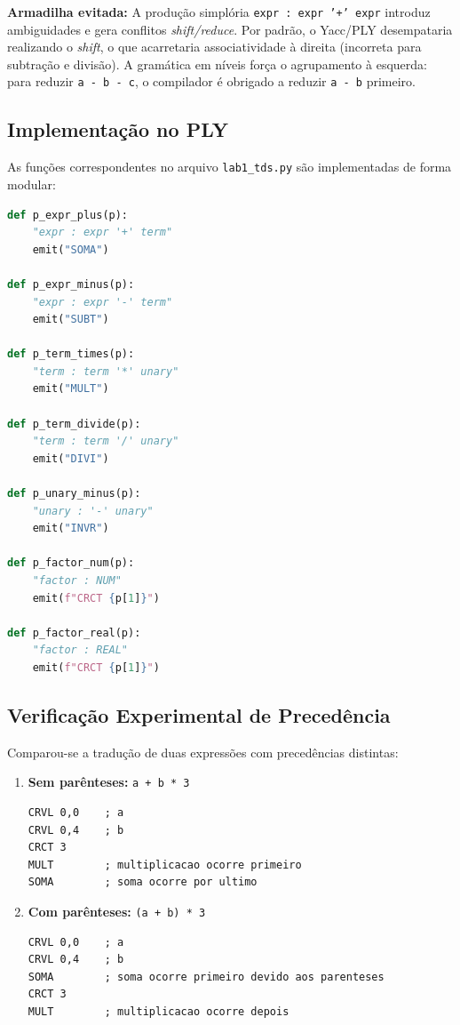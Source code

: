 \documentclass[12pt,a4paper]{article}
\begin{document}
\noindent\textbf{Armadilha evitada:} A produção simplória \texttt{expr : expr '+' expr}
introduz ambiguidades e gera conflitos \textit{shift/reduce}. Por padrão, o Yacc/PLY
desempataria realizando o \textit{shift}, o que acarretaria associatividade à direita
(incorreta para subtração e divisão). A gramática em níveis força o agrupamento à esquerda:
para reduzir \texttt{a - b - c}, o compilador é obrigado a reduzir \texttt{a - b} primeiro.

\subsection{Implementação no PLY}

As funções correspondentes no arquivo \texttt{lab1\_tds.py} são implementadas de
forma modular:

\begin{lstlisting}[language=Python]
def p_expr_plus(p):
    "expr : expr '+' term"
    emit("SOMA")

def p_expr_minus(p):
    "expr : expr '-' term"
    emit("SUBT")

def p_term_times(p):
    "term : term '*' unary"
    emit("MULT")

def p_term_divide(p):
    "term : term '/' unary"
    emit("DIVI")

def p_unary_minus(p):
    "unary : '-' unary"
    emit("INVR")

def p_factor_num(p):
    "factor : NUM"
    emit(f"CRCT {p[1]}")

def p_factor_real(p):
    "factor : REAL"
    emit(f"CRCT {p[1]}")
\end{lstlisting}

\subsection{Verificação Experimental de Precedência}

Comparou-se a tradução de duas expressões com precedências distintas:

\begin{enumerate}
    \item \textbf{Sem parênteses:} \texttt{a + b * 3}
          \begin{lstlisting}
CRVL 0,0    ; a
CRVL 0,4    ; b
CRCT 3
MULT        ; multiplicacao ocorre primeiro
SOMA        ; soma ocorre por ultimo
          \end{lstlisting}
    \item \textbf{Com parênteses:} \texttt{(a + b) * 3}
          \begin{lstlisting}
CRVL 0,0    ; a
CRVL 0,4    ; b
SOMA        ; soma ocorre primeiro devido aos parenteses
CRCT 3
MULT        ; multiplicacao ocorre depois
          \end{lstlisting}
\end{enumerate}
\end{document}
